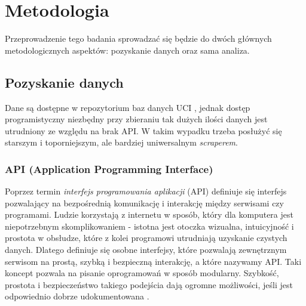 \chapter{Metodologia}

Przeprowadzenie tego badania sprowadzać się będzie do dwóch głównych metodologicznych aspektów: pozyskanie danych oraz sama analiza.

\section{Pozyskanie danych}

Dane są dostępne w repozytorium baz danych UCI \cite{Dua:2021}, jednak dostęp programistyczny niezbędny przy zbieraniu tak dużych ilości danych jest utrudniony ze względu na brak API.
W takim wypadku trzeba posłużyć się starszym i toporniejszym, ale bardziej uniwersalnym \emph{scraperem}.

\subsection{API (Application Programming Interface)}

Poprzez termin \emph{interfejs programowania aplikacji} (API) definiuje się interfejs pozwalający na bezpośrednią komunikację i interakcję między serwisami czy programami.
Ludzie korzystają z internetu w sposób, który dla komputera jest niepotrzebnym skomplikowaniem - istotna jest otoczka wizualna, intuicyjność i prostota w obsłudze, które z kolei programowi utrudniają uzyskanie czystych danych.
Dlatego definiuje się osobne interfejsy, które pozwalają zewnętrznym serwisom na prostą, szybką i bezpieczną interakcję, a które nazywamy API.
Taki koncept pozwala na pisanie oprogramowań w sposób modularny.
Szybkość, prostota i bezpieczeństwo takiego podejścia dają ogromne możliwości, jeśli jest odpowiednio dobrze udokumentowana \cite{meng2018application}.

